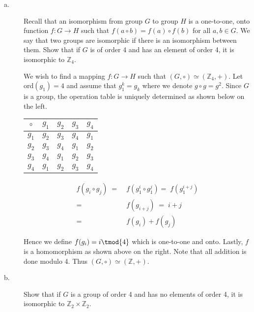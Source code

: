 \documentclass[../hw_sols.tex]{subfiles}
\begin{document}
\begin{description}

\item[a.] Recall that an isomorphism from group $G$ to group $H$ is a 
one-to-one, onto function $f : G \to H$ such that 
$f(a \circ b) = f(a) \circ f(b)$ for all $a, b \in G$. We say that two groups 
are isomorphic if there is an isomorphism between them. Show that if $G$ is of 
order 4 and has an element of order 4, it is isomorphic to $\mathbb{Z}_4$.

\begin{solution}

We wish to find a mapping $f: G \to H$ such that 
$(G, \circ) \simeq (\mathbb{Z}_4,+)$. Let ord$(g_1) = 4$ and assume that 
$g_1^k = g_k$ where we denote $g \circ g = g^2$. Since $G$ is a group, the 
operation table is uniquely determined as shown below on the left.

\begin{multicols}{2}
	\begin{center}
	\begin{tabular}{ c | c | c | c | c }
		$\circ$ & $g_1$ & $g_2$ & $g_3$ & $g_4$ \\
		\hline
		  $g_1$ & $g_2$ & $g_3$ & $g_4$ & $g_1$ \\
		\hline
		  $g_2$ & $g_3$ & $g_4$ & $g_1$ & $g_2$ \\
		\hline
		  $g_3$ & $g_4$ & $g_1$ & $g_2$ & $g_3$ \\
		\hline
		  $g_4$ & $g_1$ & $g_2$ & $g_3$ & $g_4$ \\
	\end{tabular}
	\end{center}

\noindent
\begin{align*}
	f(g_i \circ g_j) \; 
	=& \; f(g_1^i \circ g_1^j) = \; f(g_1^{i+j}) \\
	=& \; f(g_{i+j}) \; = \; i + j \\
	=& \; f(g_i) + f(g_j)
\end{align*}
\end{multicols}

Hence we define $f(g_i) = i \tmod{4}$ which is one-to-one and onto. Lastly, 
$f$ is a homomorphism as shown above on the right. Note that all addition is 
done modulo 4. Thus $(G, \circ) \simeq (\mathbb{Z},+)$.

\end{solution}


\item[b.] Show that if $G$ is a group of order 4 and has no elements of order 
4, it is isomorphic to $\mathbb{Z}_2 \times \mathbb{Z}_2$.


\end{description}
\end{document}
